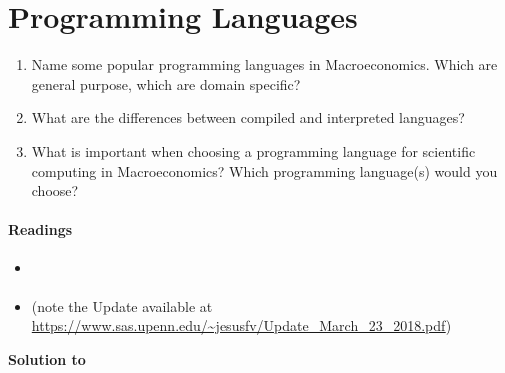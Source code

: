 \section[Programming Language]{Programming Languages\label{ex:ProgrammingLanguages}}
\begin{enumerate}
	\item Name some popular programming languages in Macroeconomics.
	Which are general purpose, which are domain specific?
	\item What are the differences between compiled and interpreted languages?
	\item What is important when choosing a programming language for scientific computing in Macroeconomics?
	Which programming language(s) would you choose?
\end{enumerate}

\paragraph{Readings} 
\begin{itemize}
	\item \textcite{Aguirre.Danielsson_2020_WhichProgrammingLanguage}
	\item \textcite{Aruoba.Fernandez-Villaverde_2015_ComparisonProgrammingLanguages} (note the Update available at \url{https://www.sas.upenn.edu/~jesusfv/Update_March_23_2018.pdf})	
\end{itemize}

\begin{solution}\textbf{Solution to }
\ifDisplaySolutions

\fi
\newpage
\end{solution}
